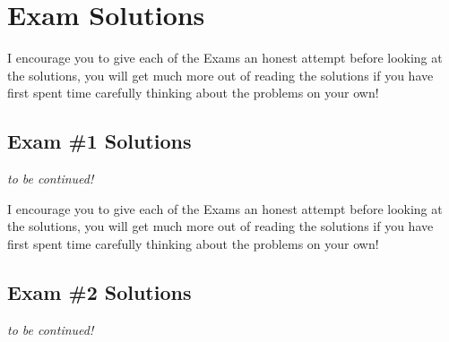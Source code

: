 \renewcommand{\thechapter}{ES}
\chapter*{Exam Solutions}
\addtocounter{chapter}{1} %
\setcounter{section}{0}

\vspace{-0.3in}
\begin{tcolorbox}
    I encourage you to give each of the Exams an honest attempt before looking at the solutions, you will get much more out of reading the solutions if you have first spent time carefully thinking about the problems on your own!
\end{tcolorbox}
\vspace{-0.2in}
\section{Exam \#1 Solutions}

\textit{to be continued!}

\newpage

\begin{tcolorbox}
    I encourage you to give each of the Exams an honest attempt before looking at the solutions, you will get much more out of reading the solutions if you have first spent time carefully thinking about the problems on your own!
\end{tcolorbox}
\vspace{-0.2in}
\section{Exam \#2 Solutions}
\textit{to be continued!}